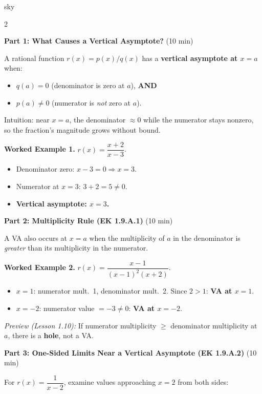 \documentclass[10pt]{article}
\begin{document}
\begin{skillbox}[Lesson]{sky}
\begin{multicols}{2}

\textbf{Part 1: What Causes a Vertical Asymptote?} (10 min)

A rational function $r(x) = p(x)/q(x)$ has a \textbf{vertical asymptote at $x = a$} when:
\begin{itemize}
  \item $q(a) = 0$ (denominator is zero at $a$), \textbf{AND}
  \item $p(a) \ne 0$ (numerator is \emph{not} zero at $a$).
\end{itemize}
Intuition: near $x = a$, the denominator $\approx 0$ while the numerator stays nonzero, so
the fraction's magnitude grows without bound.

\textbf{Worked Example 1.} $r(x) = \dfrac{x+2}{x-3}$.
\begin{itemize}
  \item Denominator zero: $x - 3 = 0 \Rightarrow x = 3$.
  \item Numerator at $x = 3$: $3 + 2 = 5 \ne 0$.
  \item \textbf{Vertical asymptote: $x = 3$.}
\end{itemize}

\columnbreak

\textbf{Part 2: Multiplicity Rule (EK 1.9.A.1)} (10 min)

A VA also occurs at $x = a$ when the multiplicity of $a$ in the denominator is
\emph{greater} than its multiplicity in the numerator.

\textbf{Worked Example 2.} $r(x) = \dfrac{x - 1}{(x-1)^2(x+2)}$.
\begin{itemize}
  \item $x = 1$: numerator mult.\ 1, denominator mult.\ 2. Since $2 > 1$: \textbf{VA at $x = 1$}.
  \item $x = -2$: numerator value $= -3 \ne 0$: \textbf{VA at $x = -2$}.
\end{itemize}
\textit{Preview (Lesson 1.10):} If numerator multiplicity $\ge$ denominator multiplicity at $a$,
there is a \textbf{hole}, not a VA.

\end{multicols}

\textbf{Part 3: One-Sided Limits Near a Vertical Asymptote (EK 1.9.A.2)} (10 min)

For $r(x) = \dfrac{1}{x - 2}$, examine values approaching $x = 2$ from both sides:


\end{skillbox}
\end{document}
